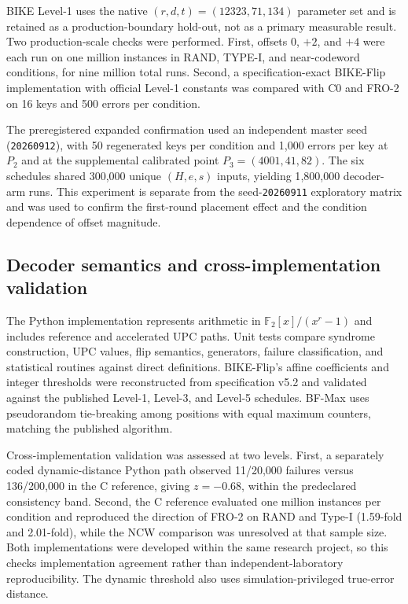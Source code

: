 \documentclass[lettersize,journal]{IEEEtran}
\begin{document}
BIKE Level-1 uses the native $(r,d,t)=(12323,71,134)$ parameter set and is retained as a production-boundary hold-out, not as a primary measurable result. Two production-scale checks were performed. First, offsets $0$, $+2$, and $+4$ were each run on one million instances in RAND, TYPE-I, and near-codeword conditions, for nine million total runs. Second, a specification-exact BIKE-Flip implementation with official Level-1 constants was compared with C0 and FRO-2 on 16 keys and 500 errors per condition.

The preregistered expanded confirmation used an independent master seed (\texttt{20260912}), with 50 regenerated keys per condition and 1{,}000 errors per key at $P_2$ and at the supplemental calibrated point $P_3=(4001,41,82)$. The six schedules shared 300{,}000 unique $(H,e,s)$ inputs, yielding 1{,}800{,}000 decoder-arm runs. This experiment is separate from the seed-\texttt{20260911} exploratory matrix and was used to confirm the first-round placement effect and the condition dependence of offset magnitude.

\subsection{Decoder semantics and cross-implementation validation}

The Python implementation represents arithmetic in $\mathbb{F}_2[x]/(x^r-1)$ and includes reference and accelerated UPC paths. Unit tests compare syndrome construction, UPC values, flip semantics, generators, failure classification, and statistical routines against direct definitions. BIKE-Flip's affine coefficients and integer thresholds were reconstructed from specification v5.2 and validated against the published Level-1, Level-3, and Level-5 schedules. BF-Max uses pseudorandom tie-breaking among positions with equal maximum counters, matching the published algorithm.

Cross-implementation validation was assessed at two levels. First, a separately coded dynamic-distance Python path observed 11/20{,}000 failures versus 136/200{,}000 in the C reference, giving $z=-0.68$, within the predeclared consistency band. Second, the C reference evaluated one million instances per condition and reproduced the direction of FRO-2 on RAND and Type-I (1.59-fold and 2.01-fold), while the NCW comparison was unresolved at that sample size. Both implementations were developed within the same research project, so this checks implementation agreement rather than independent-laboratory reproducibility. The dynamic threshold also uses simulation-privileged true-error distance.
\end{document}
